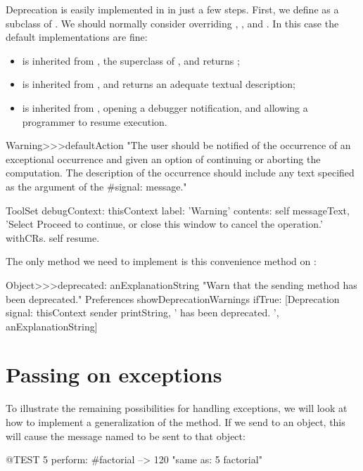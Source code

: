 \documentclass[a4paper,10pt,twoside]{book}
\begin{document}
Deprecation is easily implemented in \pharo in just a few steps.
First, we define  as a subclass of .
We should normally consider overriding , , and . In this case the default implementations are fine:

\begin{itemize}
\item {} is inherited from , the superclass of , and returns ;
\item {} is inherited from , and returns an adequate textual description;
\item {} is inherited from , opening a debugger notification, and allowing a programmer to resume execution.
\end{itemize}

\begin{code}{}
Warning>>>defaultAction 
	"The user should be notified of the occurrence of an exceptional occurrence
	and given an option of continuing or aborting the computation. The description
	of the occurrence should include any text specified as the argument of the
	#signal: message." 

	ToolSet 
		debugContext: thisContext 
		label: 'Warning' 
		contents: self messageText, 'Select Proceed to continue, or close this window to cancel the operation.' withCRs. 
		self resume. 
\end{code}

The only method we need to implement is this convenience method on :
\begin{code}{}
Object>>>deprecated: anExplanationString
	"Warn that the sending method has been deprecated."
	Preferences showDeprecationWarnings ifTrue:
		[Deprecation signal: thisContext sender printString, ' has been deprecated. ', anExplanationString]
\end{code}

\section{Passing on exceptions}

To illustrate the remaining possibilities for handling exceptions, we will look at how to implement a generalization of the  method.
If we send  to an object, this will cause the message named  to be sent  to that object:
\begin{code}{@TEST}
5 perform: #factorial --> 120    "same as: 5 factorial"
\end{code}
\end{document}
